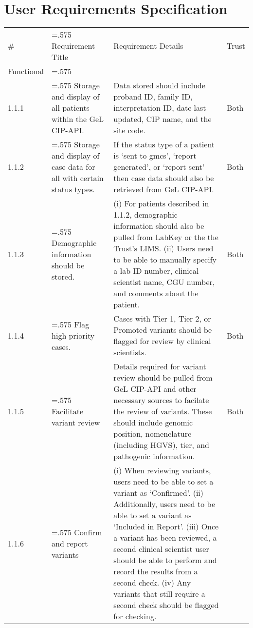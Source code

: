 \documentclass[a4paper, 10pt]{article}
\begin{document}
\section{User Requirements Specification}
\renewcommand*{\arraystretch}{1.3}
\begin{table}[h!]
    \centering
    \label{tab:urs}
    \begin{tabularx}{\textwidth}{@{}l>{\hsize=.575\hsize}X>{\hsize=1.425\hsize}Xl@{}}
        \rowcolor[HTML]{333333} 
        {\color[HTML]{FFFFFF} \#} & {\color[HTML]{FFFFFF} Requirement Title} & {\color[HTML]{FFFFFF} Requirement Details}                                                                                            & {\color[HTML]{FFFFFF} Trust} \\
        \rowcolor[HTML]{C0C0C0} 
        Functional
        &
        &
        &
        \\
        1.1.1
        & Storage and display of all patients within the GeL CIP-API.
        & Data stored should include proband ID, family ID, interpretation ID, date last updated, CIP name, and the site code.
        & Both
        \\
        1.1.2
        & Storage and display of case data for all with certain status types.
        & If the status type of a patient is `sent to gmcs', `report generated', or `report sent' then case data should also be retrieved from GeL CIP-API.
        & Both
        \\
        1.1.3
        & Demographic information should be stored.
        & (i) For patients described in 1.1.2, demographic information should also be pulled from LabKey or the the Trust's LIMS. (ii) Users need to be able to manually specify a lab ID number, clinical scientist name, CGU number, and comments about the patient.
        & Both
        \\
        1.1.4
        & Flag high priority cases.
        & Cases with Tier 1, Tier 2, or Promoted variants should be flagged for review by clinical scientists.
        & Both
        \\
        1.1.5
        & Facilitate variant review
        & Details required for variant review should be pulled from GeL CIP-API and other necessary sources to facilate the review of variants. These should include genomic position, nomenclature (including HGVS), tier, and pathogenic information.
        & Both
        \\
        1.1.6
        & Confirm and report variants 
        & (i) When reviewing variants, users need to be able to set a variant as `Confirmed'. (ii) Additionally, users need to be able to set a variant as `Included in Report'. (iii) Once a variant has been reviewed, a second clinical scientist user should be able to perform and record the results from a second check. (iv) Any variants that still require a second check should be flagged for checking.

\end{tabularx}
\end{table}
\end{document}
